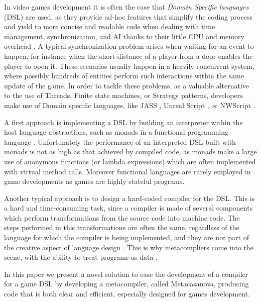 In video games development it is often the case that  \textit{Domain
Specific languages} (DSL) are used, as they provide ad-hoc features
that simplify the coding process and yield to more concise and
readable code when dealing with  time management, synchronization, and
AI thanks to their little CPU and memory overhead
\cite{DSL_SURVEY_PAPER, GAME_SCRIPTING, CASANOVA2_PAPER} . A typical
synchronization problem arises when waiting for an event to happen,
for instance when the short distance of a player from a door enables
the player to open it. These scenarios usually happen in a heavily
concurrent system, where possibly hundreds of entities perform such
interactions within the same update of the game. In order to tackle
these problems, as a valuable alternative to the use of Threads,
Finite state machines, or Strategy patterns, developers make use of
Domain specific languages, like JASS \cite{JASS}, Unreal Script \cite{UNREAL_ENGINE},
or NWScript \cite{NW_SCRIPT}.

A first approach is implementing a DSL by
building an interpreter within the host language abstractions, such as
monads in a functional programming language \cite{DSL_MONAD_PAPER,
CASANOVA1_PAPER, SCRIPT_MONAD_PAPER}. Unfortunately the performance of
an interpreted DSL built with monads is not as high as that achieved
by compiled code, as monads make a large use of anonymous functions
(or lambda expressions) which are often implemented with virtual
method calls. Moreover functional languages are rarely employed in
game developments as games are highly stateful programs.

Another typical approach is to design a hard-coded compiler for the
DSL. This is a hard and time-consuming task, since a compiler is made
of several components which perform transformations from the source
code into machine code. The steps performed in this transformations
are often the same, regardless of the language for which the compiler
is being implemented, and they are not part of the creative aspect of
language design \cite{CWIC}. This is why metacompliers come into the
scene, with the ability to treat programs as data
\cite{GENERATIVE_PROGRAMMING_CZARNECKI}.

In this paper we present a novel solution to ease the development of a
compiler for a game DSL by developing a metacompiler, called Metacasanova, producing code
that is both clear and efficient, especially designed for games
development.

